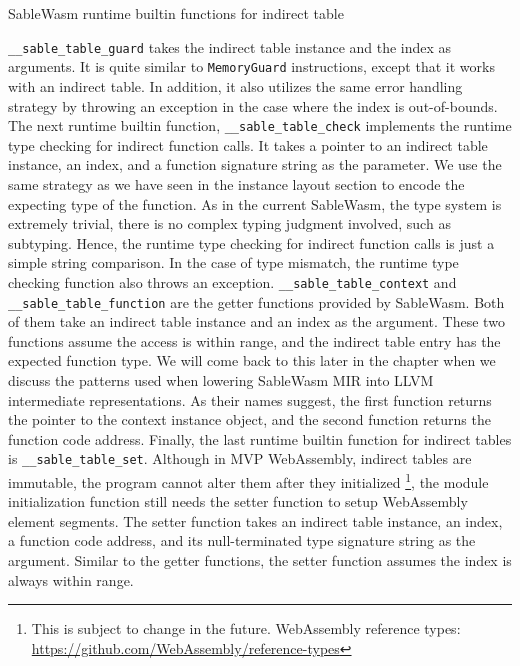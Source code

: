 \begin{table}[h]
    
    \caption{SableWasm runtime builtin functions for indirect table}
    \label{tbl:sablewasm-runtime-table-api}
\end{table}

\texttt{\_\_sable\_table\_guard} takes the indirect table instance and the
index as arguments. It is quite similar to \texttt{MemoryGuard} instructions,
except that it works with an indirect table. In addition, it also utilizes the
same error handling strategy by throwing an exception in the case where the
index is out-of-bounds. The next runtime builtin function,
\texttt{\_\_sable\_table\_check} implements the runtime type checking for
indirect function calls. It takes a pointer to an indirect table instance,
an index, and a function signature string as the parameter. We use the same
strategy as we have seen in the instance layout section to encode the
expecting type of the function. As in the current SableWasm, the type system is
extremely trivial, there is no complex typing judgment involved, such as
subtyping. Hence, the runtime type checking for indirect function calls is just
a simple string comparison. In the case of type mismatch, the runtime type
checking function also throws an exception. \texttt{\_\_sable\_table\_context}
and \texttt{\_\_sable\_table\_function} are the getter functions provided by
SableWasm. Both of them take an indirect table instance and an index as the
argument. These two functions assume the access is within range, and the
indirect table entry has the expected function type. We will come back to this
later in the chapter when we discuss the patterns used when lowering SableWasm
MIR into LLVM intermediate representations. As their names suggest, the first
function returns the pointer to the context instance object, and the second
function returns the function code address. Finally, the last runtime builtin
function for indirect tables is \texttt{\_\_sable\_table\_set}. Although in MVP
WebAssembly, indirect tables are immutable, the program cannot alter them after
they initialized \footnote{This is subject to change in the future. WebAssembly
    reference types:\\\url{https://github.com/WebAssembly/reference-types}},
the module initialization function still needs the setter function to setup
WebAssembly element segments. The setter function takes an indirect table
instance, an index, a function code address, and its null-terminated type
signature string as the argument. Similar to the getter functions, the setter
function assumes the index is always within range.

